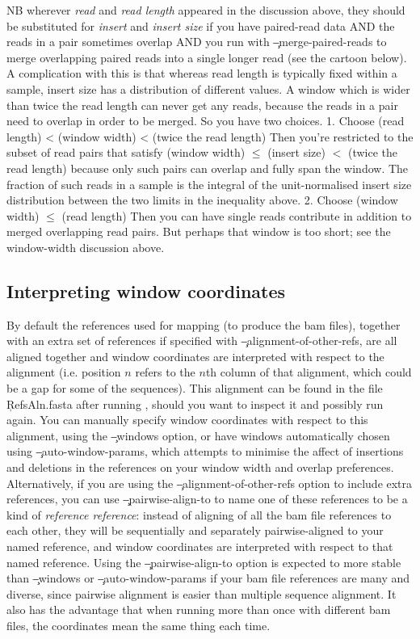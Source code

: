 NB wherever {\it read} and {\it read length} appeared in the discussion above, they should be substituted for {\it insert} and {\it insert size} if you have paired-read data AND the reads in a pair sometimes overlap AND you run \p with \c{--merge-paired-reads} to merge overlapping paired reads into a single longer read (see the cartoon below).
A complication with this is that whereas read length is typically fixed within a sample, insert size has a distribution of different values.
A window which is wider than twice the read length can never get any reads, because the reads in a pair need to overlap in order to be merged.
So you have two choices.
1. Choose  
(read length) < (window width) < (twice the read length)  
Then you're restricted to the subset of read pairs that satisfy  
(window width) $\leq$ (insert size) $<$ (twice the read length)  
because only such pairs can overlap and fully span the window.
The fraction of such reads in a sample is the integral of the unit-normalised insert size distribution between the two limits in the inequality above.
2. Choose  
(window width) $\leq$ (read length)  
Then you can have single reads contribute in addition to merged overlapping read pairs.
But perhaps that window is too short; see the window-width discussion above.


\subsection*{Interpreting window coordinates}
By default the references used for mapping (to produce the bam files), together with an extra set of references if specified with \c{--alignment-of-other-refs}, are all aligned together and window coordinates are interpreted with respect to the alignment (i.e. position $n$ refers to the $n$th column of that alignment, which could be a gap for some of the sequences).
This alignment can be found in the file \c{RefsAln.fasta} after running \p, should you want to inspect it and possibly run again.
You can manually specify window coordinates with respect to this alignment, using the \c{--windows} option, or have windows automatically chosen using \c{--auto-window-params}, which attempts to minimise the affect of insertions and deletions in the references on your window width and overlap preferences.
Alternatively, if you are using the \c{--alignment-of-other-refs} option to include extra references, you can use \c{--pairwise-align-to} to name one of these references to be a kind of {\it reference reference}: instead of aligning of all the bam file references to each other, they will be sequentially and separately pairwise-aligned to your named reference, and window coordinates are interpreted with respect to that named reference.
Using the \c{--pairwise-align-to} option is expected to more stable than \c{--windows} or \c{--auto-window-params} if your bam file references are many and diverse, since pairwise alignment is easier than multiple sequence alignment.
It also has the advantage that when running \p more than once with different bam files, the coordinates mean the same thing each time.

